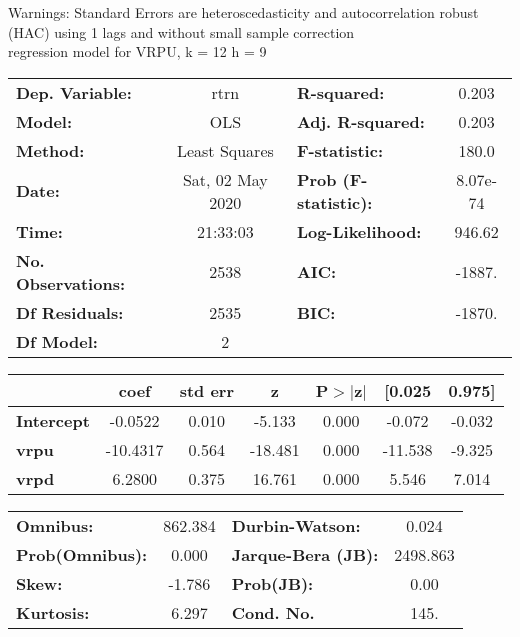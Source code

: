 Warnings: \newline
 [1] Standard Errors are heteroscedasticity and autocorrelation robust (HAC) using 1 lags and without small sample correction\\ 

regression model for VRPU, k = 12 h = 9\begin{center}
\begin{tabular}{lclc}
\toprule
\textbf{Dep. Variable:}    &       rtrn       & \textbf{  R-squared:         } &     0.203   \\
\textbf{Model:}            &       OLS        & \textbf{  Adj. R-squared:    } &     0.203   \\
\textbf{Method:}           &  Least Squares   & \textbf{  F-statistic:       } &     180.0   \\
\textbf{Date:}             & Sat, 02 May 2020 & \textbf{  Prob (F-statistic):} &  8.07e-74   \\
\textbf{Time:}             &     21:33:03     & \textbf{  Log-Likelihood:    } &    946.62   \\
\textbf{No. Observations:} &        2538      & \textbf{  AIC:               } &    -1887.   \\
\textbf{Df Residuals:}     &        2535      & \textbf{  BIC:               } &    -1870.   \\
\textbf{Df Model:}         &           2      & \textbf{                     } &             \\
\bottomrule
\end{tabular}
\begin{tabular}{lcccccc}
                   & \textbf{coef} & \textbf{std err} & \textbf{z} & \textbf{P$> |$z$|$} & \textbf{[0.025} & \textbf{0.975]}  \\
\midrule
\textbf{Intercept} &      -0.0522  &        0.010     &    -5.133  &         0.000        &       -0.072    &       -0.032     \\
\textbf{vrpu}      &     -10.4317  &        0.564     &   -18.481  &         0.000        &      -11.538    &       -9.325     \\
\textbf{vrpd}      &       6.2800  &        0.375     &    16.761  &         0.000        &        5.546    &        7.014     \\
\bottomrule
\end{tabular}
\begin{tabular}{lclc}
\textbf{Omnibus:}       & 862.384 & \textbf{  Durbin-Watson:     } &    0.024  \\
\textbf{Prob(Omnibus):} &   0.000 & \textbf{  Jarque-Bera (JB):  } & 2498.863  \\
\textbf{Skew:}          &  -1.786 & \textbf{  Prob(JB):          } &     0.00  \\
\textbf{Kurtosis:}      &   6.297 & \textbf{  Cond. No.          } &     145.  \\
\bottomrule
\end{tabular}
\end{center}

